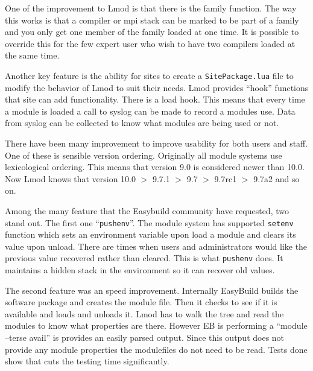 One of the improvement to Lmod is that there is the family function.
The way this works is that a compiler or mpi stack can be marked to be
part of a family and you only get one member of the family loaded at
one time.  It is possible to override this for the few expert user who
wish to have two compilers loaded at the same time.

Another key feature is the ability for sites to create a
\texttt{SitePackage.lua} file to modify the behavior of Lmod to suit
their needs.  Lmod provides ``hook'' functions that site can add
functionality.  There is a load hook.  This means that
every time a module is loaded a call to syslog can be
made to record a modules use.  Data from syslog can be collected to
know what modules are being used or not.

There have been many improvement to improve usability for both users
and staff.  One of these is sensible version ordering.  Originally all
module systems use lexicological ordering.  This means that version
9.0 is considered newer than 10.0.  Now Lmod knows that version 10.0 $>$
9.7.1 $>$ 9.7 $>$ 9.7rc1 $>$ 9.7a2 and so on.

Among the many feature that the Easybuild community have requested,
two stand out.  The first one ``\texttt{pushenv}''.  The module system
has supported \texttt{setenv} function which sets an environment variable 
upon load a module and clears its value upon unload.  There are times
when users and administrators would like the previous value recovered
rather than cleared.  This is what \texttt{pushenv} does.  It
maintains a hidden stack in the environment so it can recover old
values.

The second feature was an speed improvement.  Internally EasyBuild
builds the software package and creates the module file.  Then it
checks to see if it is available and loads and unloads it.  Lmod has
to walk the tree and read the modules to know what properties are
there. However EB is performing a ``module --terse avail'' is provides
an easily parsed output.  Since this output does not provide any
module properties the modulefiles do not need to be read.  Tests done
show that cuts the testing time significantly.

